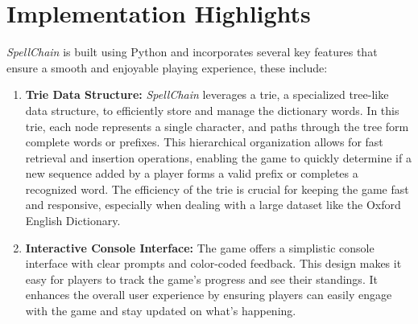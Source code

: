 \documentclass{article}
\begin{document}
\section*{Implementation Highlights}
\textit{SpellChain} is built using Python and incorporates several key features that ensure a smooth and enjoyable playing experience, these include:
\begin{enumerate}
    \item \textbf{Trie Data Structure:} \textit{SpellChain} leverages a trie, a specialized tree-like data structure, to efficiently store and manage the dictionary words. In this trie, each node represents a single character, and paths through the tree form complete words or prefixes. This hierarchical organization allows for fast retrieval and insertion operations, enabling the game to quickly determine if a new sequence added by a player forms a valid prefix or completes a recognized word. The efficiency of the trie is crucial for keeping the game fast and responsive, especially when dealing with a large dataset like the Oxford English Dictionary.
    \item \textbf{Interactive Console Interface:} The game offers a simplistic console interface with clear prompts and color-coded feedback. This design makes it easy for players to track the game's progress and see their standings. It enhances the overall user experience by ensuring players can easily engage with the game and stay updated on what's happening.
\end{enumerate}
\end{document}

